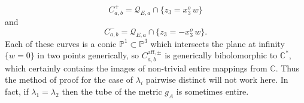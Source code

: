 \documentclass[12pt,reqno]{amsart}\usepackage{amssymb,amsmath,amscd,epsfig,amsthm,enumerate,import,eufrak}
\theoremstyle{definition}
\theoremstyle{remark}
\numberwithin{equation}{section}
\theoremstyle{plain}
\theoremstyle{definition}
\def \c {\mathbb{C}}
\def \p {\mathbb{P}}
\def \q {\mathcal{Q}}
\theoremstyle{remark}
\numberwithin{theorem}{section}
\begin{document}
%
\[
	C^+_{a,b} = \q_{E,a} \cap \{ z_3 = x_3^o \, w\} 
\]
%
and
%
\[	
	C^-_{a,b} = \q_{E,a} \cap \{z_3 = - x_3^o \, w\}. 
\]
%
Each of these curves is a conic $\p^1 \subset \p^3$ which intersects the plane at infinity $\{w = 0\}$ in two points generically, so $C^{\text{aff}, \pm}_{a,b}$ is generically biholomorphic to $\c^*$, which certainly contains the images of non-trivial entire mappings from $\c$. Thus the method of proof for the case of $\lambda_i$ pairwise distinct will not work here. In fact, if $\lambda_1 = \lambda_2$ then the tube of the metric $g_A$ is sometimes entire.
%
%
%
%
%
%
%
%
%
%
%
\end{document}
